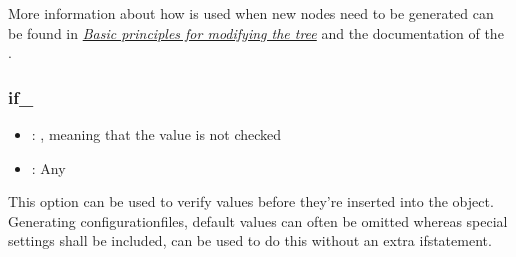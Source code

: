 \documentclass[a4paper,10pt,english]{sphinxmanual}
\begin{document}
\begin{sphinxVerbatim}[commandchars=\\\{\},numbers=left,firstnumber=1,stepnumber=1]
  
  
  
 
  
  
  \PYG{p}{[}\PYG{p}{]}
  
\end{sphinxVerbatim}

\sphinxAtStartPar
More information about how  is used when new nodes need to be generated can be found in {\hyperref[\detokenize{README:basic-principles-for-modifying-the-tree}]{\emph{Basic principles for modifying the tree}}} and the documentation of the  {\hyperref[\detokenize{README:node_types}]{\emph{}}}.


\subsubsection{if\_}
\label{\detokenize{README:if}}\begin{itemize}
\item {}
\sphinxAtStartPar
{}: , meaning that the value is not checked

\item {}
\sphinxAtStartPar
{}: Any

\end{itemize}

\sphinxAtStartPar
This option can be used to verify values before they’re inserted into the \sphinxhyphen{}object. Generating configuration\sphinxhyphen{}files, default values can often be omitted whereas special settings shall be included,  can be used to do this without an extra if\sphinxhyphen{}statement.
\end{document}
